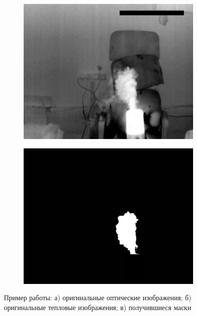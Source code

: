 \documentclass[t]{beamer}
\begin{document}
\begin{frame}[noframenumbering]
\begin{figure}[h!]
\begin{subfigure}{.30\textwidth}
			\includegraphics[width = \textwidth]{image/chapter_3/examples/tep/214}
			\caption{}
		\end{subfigure}
		\begin{subfigure}{.30\textwidth}
			\centering
			\includegraphics[width = \textwidth]{image/chapter_3/examples/mask/214}
			\caption{}
		\end{subfigure}
		\caption{Пример работы: а) оригинальные оптические изображения; б) оригинальные тепловые изображения; в) получившиеся маски}
		\label{fig:test_segm}
	\end{figure}
\end{frame}
\end{document}
